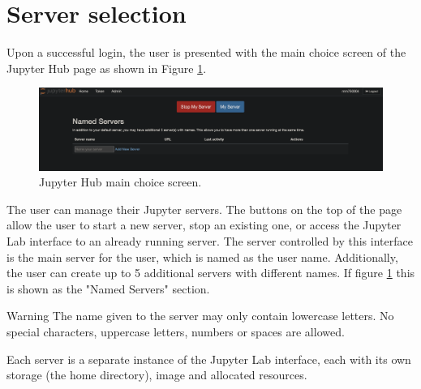 \section{Server selection}
\label{sec:serverselection}

Upon a successful login, the user is presented with the main choice screen of the Jupyter Hub page as shown in Figure
\ref{fig:mainchoice}. 

\begin{figure}[!ht]
	\centering
	\includegraphics[width=0.7\linewidth]{img/mainchoice.png}
	\caption{Jupyter Hub main choice screen.}
	\label{fig:mainchoice}
\end{figure}

The user can manage their Jupyter servers.
The buttons on the top of the page allow the user to start a new server,
stop an existing one, or access the Jupyter Lab interface
to an already running server. The server controlled by this interface
is the main server for the user, which is named as the user name.
Additionally, the user can create up to 5 additional servers 
with different names. If figure \ref{fig:mainchoice} this is shown
as the "Named Servers" section. 


\begin{bclogo}[logo=\bcinfo, couleurBarre=orange, noborder=true, couleur=white]{Warning}
The name given to the server may only contain lowercase letters.
No special characters, uppercase letters, numbers or spaces are allowed.
\end{bclogo}

Each server is a separate instance of the Jupyter Lab interface,
each with its own storage (the home directory), image and 
allocated resources.